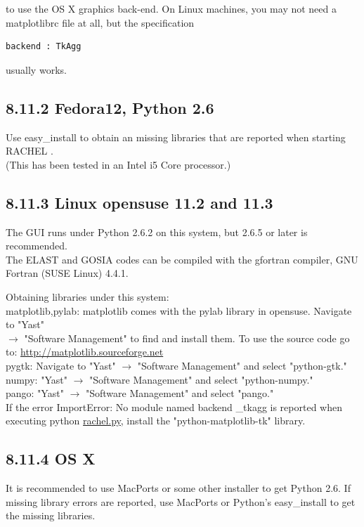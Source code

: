 \documentclass[10pt]{article}
\begin{document}
to use the OS X graphics back-end. On Linux machines, you may not need a matplotlibrc file at all, but the specification

\begin{verbatim}
backend : TkAgg
\end{verbatim}

usually works.

\subsection*{8.11.2 Fedora12, Python 2.6}
Use easy\_install to obtain an missing libraries that are reported when starting RACHEL .\\
(This has been tested in an Intel i5 Core processor.)

\subsection*{8.11.3 Linux opensuse 11.2 and 11.3}
The GUI runs under Python 2.6.2 on this system, but 2.6.5 or later is recommended.\\
The ELAST and GOSIA codes can be compiled with the gfortran compiler, GNU Fortran (SUSE Linux) 4.4.1.

Obtaining libraries under this system:\\
matplotlib,pylab: matplotlib comes with the pylab library in opensuse. Navigate to "Yast"\\
$\rightarrow$ "Software Management" to find and install them. To use the source code go to: \href{http://matplotlib.sourceforge.net}{http://matplotlib.sourceforge.net}\\
pygtk: Navigate to "Yast" $\rightarrow$ "Software Management" and select "python-gtk."\\
numpy: "Yast" $\rightarrow$ "Software Management" and select "python-numpy."\\
pango: "Yast" $\rightarrow$ "Software Management" and select "pango."\\
If the error ImportError: No module named backend \_tkagg is reported when executing python \href{http://rachel.py}{rachel.py}, install the "python-matplotlib-tk" library.

\subsection*{8.11.4 OS X}
It is recommended to use MacPorts or some other installer to get Python 2.6. If missing library errors are reported, use MacPorts or Python's easy\_install to get the missing libraries.
\end{document}
